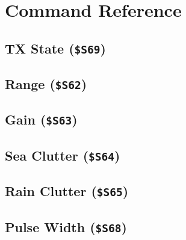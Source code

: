 \documentclass[11pt,letterpaper]{article}
\begin{document}
\newpage
\section{Command Reference}
\label{sec:command-reference}


\subsection{TX State (\texttt{\$S69})}
\label{subsec:cmd-tx}


\subsection{Range (\texttt{\$S62})}
\label{subsec:cmd-range}


\subsection{Gain (\texttt{\$S63})}
\label{subsec:cmd-gain}


\subsection{Sea Clutter (\texttt{\$S64})}
\label{subsec:cmd-sea}


\subsection{Rain Clutter (\texttt{\$S65})}
\label{subsec:cmd-rain}


\subsection{Pulse Width (\texttt{\$S68})}
\label{subsec:cmd-pulse}
\end{document}

